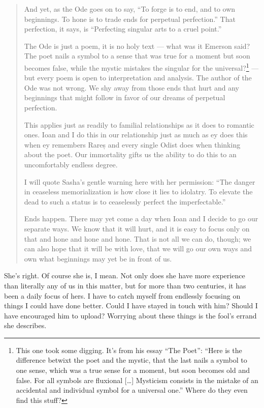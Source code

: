 \begin{quote}
And yet, as the Ode goes on to say, ``To forge is to end, and to own beginnings. To hone is to trade ends for perpetual perfection.'' That perfection, it says, is ``Perfecting singular arts to a cruel point.''

The Ode is just a poem, it is no holy text — what was it Emerson said? The poet nails a symbol to a sense that was true for a moment but soon becomes false, while the mystic mistakes the singular for the universal?\footnote{This one took some digging. It's from his essay ``The Poet'': ``Here is the difference betwixt the poet and the mystic, that the last nails a symbol to one sense, which was a true sense for a moment, but soon becomes old and false. For all symbols are fluxional {[}\ldots{]} Mysticism consists in the mistake of an accidental and individual symbol for a universal one.'' Where do they even find this stuff?} — but every poem is open to interpretation and analysis. The author of the Ode was not wrong. We shy away from those ends that hurt and any beginnings that might follow in favor of our dreams of perpetual perfection.

This applies just as readily to familial relationships as it does to romantic ones. Ioan and I do this in our relationship just as much as ey does this when ey remembers Rareș and every single Odist does when thinking about the poet. Our immortality gifts us the ability to do this to an uncomfortably endless degree.

I will quote Sasha's gentle warning here with her permission: ``The danger in ceaseless memorialization is how close it lies to idolatry. To elevate the dead to such a status is to ceaselessly perfect the imperfectable.''

Ends happen. There may yet come a day when Ioan and I decide to go our separate ways. We know that it will hurt, and it is easy to focus only on that and hone and hone and hone. That is not all we can do, though; we can also hope that it will be with love, that we will go our own ways and own what beginnings may yet be in front of us.
\end{quote}

She's right. Of course she is, I mean. Not only does she have more experience than literally any of us in this matter, but for more than two centuries, it has been a daily focus of hers. I have to catch myself from endlessly focusing on things I could have done better. Could I have stayed in touch with him? Should I have encouraged him to upload? Worrying about these things is the fool's errand she describes.


